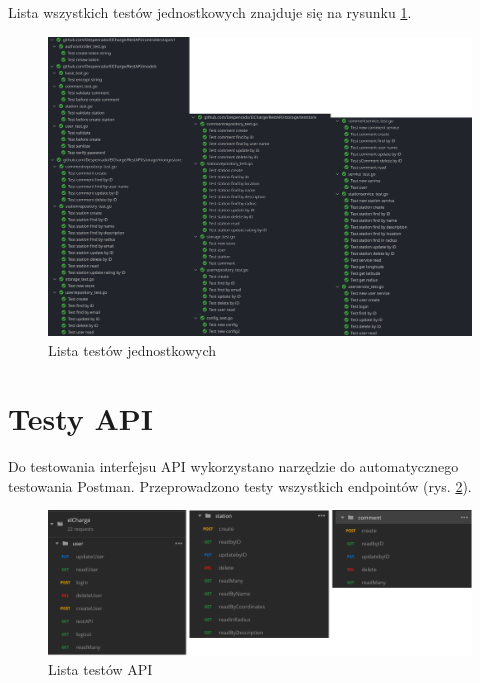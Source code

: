 Lista wszystkich testów jednostkowych znajduje się na rysunku \ref{fig:test_list}.
\begin{figure}[ht]
    \centering
        \includegraphics[width=1\linewidth]{rys04/test_list.png}
        \caption{Lista testów jednostkowych}
    \label{fig:test_list}
\end{figure}

% 
\section{Testy API}
Do testowania interfejsu API wykorzystano narzędzie do automatycznego testowania Postman.
Przeprowadzono testy wszystkich endpointów (rys. \ref{fig:postma_list}).
\begin{figure}[ht]
    \centering
        \includegraphics[width=1\linewidth]{rys04/postman_list.png}
        \caption{Lista testów API}
    \label{fig:postma_list}
\end{figure}
\newpage

